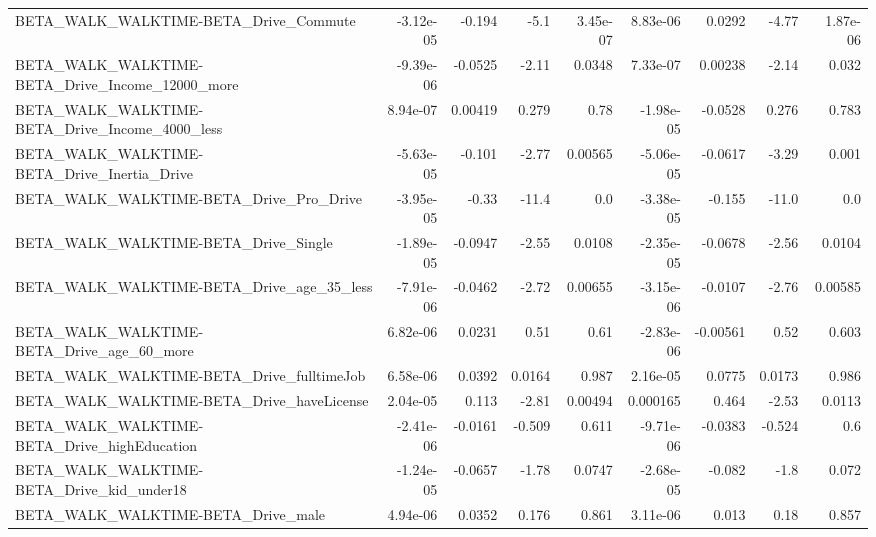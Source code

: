 \begin{tabular}{lrrrrrrrr}
BETA\_WALK\_WALKTIME-BETA\_Drive\_Commute              &   -3.12e-05 &       -0.194 &     -5.1 & 3.45e-07 &   8.83e-06 &      0.0292 &        -4.77 &      1.87e-06 \\
BETA\_WALK\_WALKTIME-BETA\_Drive\_Income\_12000\_more    &   -9.39e-06 &      -0.0525 &    -2.11 &   0.0348 &   7.33e-07 &     0.00238 &        -2.14 &         0.032 \\
BETA\_WALK\_WALKTIME-BETA\_Drive\_Income\_4000\_less     &    8.94e-07 &      0.00419 &    0.279 &     0.78 &  -1.98e-05 &     -0.0528 &        0.276 &         0.783 \\
BETA\_WALK\_WALKTIME-BETA\_Drive\_Inertia\_Drive        &   -5.63e-05 &       -0.101 &    -2.77 &  0.00565 &  -5.06e-05 &     -0.0617 &        -3.29 &         0.001 \\
BETA\_WALK\_WALKTIME-BETA\_Drive\_Pro\_Drive            &   -3.95e-05 &        -0.33 &    -11.4 &      0.0 &  -3.38e-05 &      -0.155 &        -11.0 &           0.0 \\
BETA\_WALK\_WALKTIME-BETA\_Drive\_Single               &   -1.89e-05 &      -0.0947 &    -2.55 &   0.0108 &  -2.35e-05 &     -0.0678 &        -2.56 &        0.0104 \\
BETA\_WALK\_WALKTIME-BETA\_Drive\_age\_35\_less          &   -7.91e-06 &      -0.0462 &    -2.72 &  0.00655 &  -3.15e-06 &     -0.0107 &        -2.76 &       0.00585 \\
BETA\_WALK\_WALKTIME-BETA\_Drive\_age\_60\_more          &    6.82e-06 &       0.0231 &     0.51 &     0.61 &  -2.83e-06 &    -0.00561 &         0.52 &         0.603 \\
BETA\_WALK\_WALKTIME-BETA\_Drive\_fulltimeJob          &    6.58e-06 &       0.0392 &   0.0164 &    0.987 &   2.16e-05 &      0.0775 &       0.0173 &         0.986 \\
BETA\_WALK\_WALKTIME-BETA\_Drive\_haveLicense          &    2.04e-05 &        0.113 &    -2.81 &  0.00494 &   0.000165 &       0.464 &        -2.53 &        0.0113 \\
BETA\_WALK\_WALKTIME-BETA\_Drive\_highEducation        &   -2.41e-06 &      -0.0161 &   -0.509 &    0.611 &  -9.71e-06 &     -0.0383 &       -0.524 &           0.6 \\
BETA\_WALK\_WALKTIME-BETA\_Drive\_kid\_under18          &   -1.24e-05 &      -0.0657 &    -1.78 &   0.0747 &  -2.68e-05 &      -0.082 &         -1.8 &         0.072 \\
BETA\_WALK\_WALKTIME-BETA\_Drive\_male                 &    4.94e-06 &       0.0352 &    0.176 &    0.861 &   3.11e-06 &       0.013 &         0.18 &         0.857 \\

\end{tabular}
